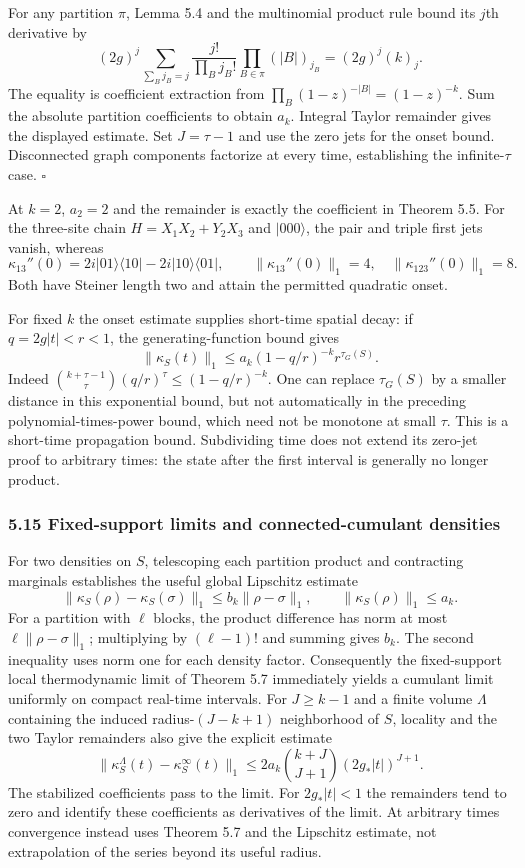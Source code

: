 \documentclass[
  11pt,
]{article}
\begin{document}
For any partition \(\pi\), Lemma 5.4 and the multinomial product rule bound its
\(j\)th derivative by
\[
(2g)^j\sum_{\sum_Bj_B=j}\frac{j!}{\prod_Bj_B!}
                   \prod_{B\in\pi}(|B|)_{j_B}=(2g)^j(k)_j.
\]
The equality is coefficient extraction from
\(\prod_B(1-z)^{-|B|}=(1-z)^{-k}\). Sum the absolute partition coefficients
to obtain \(a_k\). Integral Taylor remainder gives the displayed estimate.
Set \(J=\tau-1\) and use the zero jets for the onset bound. Disconnected graph
components factorize at every time, establishing the infinite-\(\tau\) case.
\(\square\)

At \(k=2\), \(a_2=2\) and the remainder is exactly the coefficient in Theorem 5.5.
For the three-site chain
\(H=X_1X_2+Y_2X_3\) and \(|000\rangle\), the pair and triple first jets vanish,
whereas
\[
\kappa_{13}''(0)=2i|01\rangle\langle10|-2i|10\rangle\langle01|,
\qquad \lVert \kappa_{13}''(0)\rVert_1=4,\quad
\lVert \kappa_{123}''(0)\rVert_1=8.
\]
Both have Steiner length two and attain the permitted quadratic onset.

For fixed \(k\) the onset estimate supplies short-time spatial decay: if
\(q=2g|t|<r<1\), the generating-function bound gives
\[
\lVert \kappa_S(t)\rVert_1\le a_k(1-q/r)^{-k}r^{\tau_G(S)}.
\]
Indeed \(\binom{k+\tau-1}{\tau}(q/r)^\tau\le(1-q/r)^{-k}\).
One can replace \(\tau_G(S)\) by a smaller distance in this exponential
bound, but not automatically in the preceding polynomial-times-power bound,
which need not be monotone at small \(\tau\). This is a short-time propagation
bound. Subdividing time does not extend its zero-jet proof to arbitrary times:
the state after the first interval is generally no longer product.

\subsubsection{5.15 Fixed-support limits and connected-cumulant densities}\label{fixed-support-limits-and-connected-cumulant-densities}

For two densities on \(S\), telescoping each partition product and contracting
marginals establishes the useful global Lipschitz estimate
\[
\lVert \kappa_S(\rho)-\kappa_S(\sigma)\rVert_1\le b_k\lVert \rho-\sigma\rVert_1,
\qquad \lVert \kappa_S(\rho)\rVert_1\le a_k.
\]
For a partition with \(\ell\) blocks, the product difference has norm at most
\(\ell\lVert \rho-\sigma\rVert_1\); multiplying by \((\ell-1)!\) and summing gives
\(b_k\). The second inequality uses norm one for each density factor.
Consequently the fixed-support local thermodynamic limit of Theorem 5.7
immediately yields a cumulant limit uniformly on compact real-time intervals.
For \(J\ge k-1\) and a finite volume \(\Lambda\) containing the induced
radius-\((J-k+1)\) neighborhood of \(S\), locality and the two Taylor remainders
also give the explicit estimate
\[
\lVert \kappa_S^\Lambda(t)-\kappa_S^\infty(t)\rVert_1
 \le2a_k\binom{k+J}{J+1}(2g_*|t|)^{J+1}.
\]
The stabilized coefficients pass to the limit. For \(2g_*|t|<1\) the remainders
tend to zero and identify these coefficients as derivatives of the limit.
At arbitrary times convergence instead uses Theorem 5.7 and the Lipschitz
estimate, not extrapolation of the series beyond its useful radius.
\end{document}
